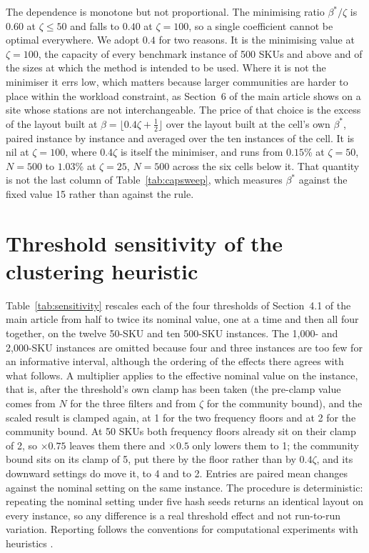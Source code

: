\documentclass[11pt]{article}
\begin{document}
The dependence is monotone but not proportional. The minimising ratio $\beta^\ast/\zeta$ is
$0.60$ at $\zeta\le 50$ and falls to $0.40$ at $\zeta=100$, so a single coefficient cannot be
optimal everywhere. We adopt $0.4$ for two reasons. It is the minimising value at $\zeta=100$,
the capacity of every benchmark instance of 500 SKUs and above and of the sizes at which the
method is intended to be used. Where it is not the minimiser it errs low, which matters because
larger communities are harder to place within the workload constraint, as Section~6 of the main
article shows on a site whose stations are not interchangeable. The price of that choice is the
excess of the layout built at $\beta=\lfloor 0.4\zeta+\tfrac12\rfloor$ over the layout built at
the cell's own $\beta^\ast$, paired instance by instance and averaged over the ten instances of
the cell. It is nil at $\zeta=100$, where $0.4\zeta$ is itself the minimiser, and runs from
$0.15$\% at $\zeta=50$, $N=500$ to $1.03$\% at $\zeta=25$, $N=500$ across the six cells below
it. That quantity is not the last column of Table~\ref{tab:capsweep}, which measures $\beta^\ast$
against the fixed value 15 rather than against the rule.

\section{Threshold sensitivity of the clustering heuristic}\label{sup:sensitivity}
Table~\ref{tab:sensitivity} rescales each of the four thresholds of Section~4.1 of the main
article from half to twice its nominal value, one at a time and then all four together, on the
twelve 50-SKU and ten 500-SKU instances. The 1,000- and 2,000-SKU instances are omitted because
four and three instances are too few for an informative interval, although the ordering of the
effects there agrees with what follows. A multiplier applies to the effective nominal value on
the instance, that is, after the threshold's own clamp has been taken (the pre-clamp value comes
from $N$ for the three filters and from $\zeta$ for the community bound), and the scaled result
is clamped again, at 1 for the two frequency floors and at 2 for the community bound. At 50 SKUs
both frequency floors already sit on their clamp of 2, so $\times0.75$ leaves them there and
$\times0.5$ only lowers them to 1; the community bound sits on its clamp of 5, put there by the
floor rather than by $0.4\zeta$, and its downward settings do move it, to 4 and to 2.
Entries are paired mean changes against the nominal setting on the same instance. The
procedure is deterministic: repeating the nominal setting under five hash seeds returns an
identical layout on every instance, so any difference is a real threshold effect and not
run-to-run variation. Reporting follows the conventions for computational experiments with
heuristics \citep{barr1995designing, hooker1995testing}.
\end{document}
